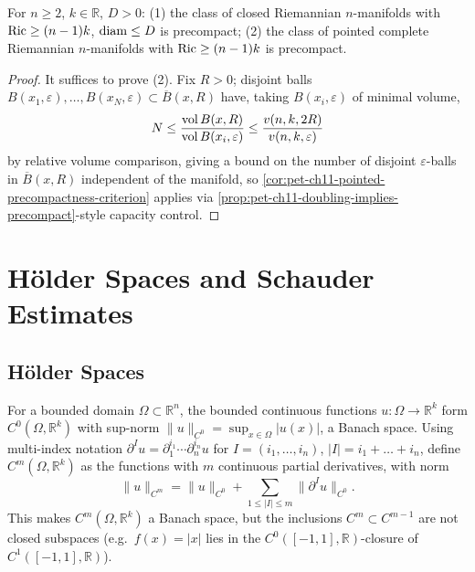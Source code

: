 \begin{corollary}
  \label{cor:pet-ch11-ricci-diam-precompactness}
  For $n\ge2$, $k\in\mathbb{R}$, $D>0$: (1) the class of closed Riemannian
  $n$-manifolds with $\operatorname{Ric}\ge(n-1)k$, $\operatorname{diam}\le D$ is precompact; (2) the
  class of pointed complete Riemannian $n$-manifolds with $\operatorname{Ric}\ge(n-1)k$ is
  precompact.
\end{corollary}
\begin{proof}
  It suffices to prove (2). Fix $R>0$; disjoint balls
  $B(x_1,\varepsilon),\dots,B(x_N,\varepsilon)\subset\overline{B}(x,R)$ have,
  taking $B(x_i,\varepsilon)$ of minimal volume,
  \[
    N\le\frac{\operatorname{vol} B(x,R)}{\operatorname{vol} B(x_i,\varepsilon)}\le\frac{v(n,k,2R)}{v(n,k,\varepsilon)}
  \]
  by relative volume comparison, giving a bound on the number of disjoint
  $\varepsilon$-balls in $\overline{B}(x,R)$ independent of the manifold, so
  \cref{cor:pet-ch11-pointed-precompactness-criterion} applies via
  \cref{prop:pet-ch11-doubling-implies-precompact}-style capacity control.
\end{proof}

\section{Hölder Spaces and Schauder Estimates}

\subsection{Hölder Spaces}

\begin{definition}
  \label{def:pet-ch11-cm-norm}
  For a bounded domain $\Omega\subset\mathbb{R}^n$, the bounded continuous
  functions $u:\Omega\to\mathbb{R}^k$ form $C^0(\Omega,\mathbb{R}^k)$ with sup-norm
  $\|u\|_{C^0}=\sup_{x\in\Omega}|u(x)|$, a Banach space. Using multi-index
  notation $\partial^Iu=\partial_1^{i_1}\cdots\partial_n^{i_n}u$ for
  $I=(i_1,\dots,i_n)$, $|I|=i_1+\dots+i_n$, define $C^m(\Omega,\mathbb{R}^k)$ as
  the functions with $m$ continuous partial derivatives, with norm
  \[
    \|u\|_{C^m}=\|u\|_{C^0}+\sum_{1\le|I|\le m}\|\partial^Iu\|_{C^0}.
  \]
  This makes $C^m(\Omega,\mathbb{R}^k)$ a Banach space, but the inclusions
  $C^m\subset C^{m-1}$ are not closed subspaces (e.g.\ $f(x)=|x|$ lies in the
  $C^0([-1,1],\mathbb{R})$-closure of $C^1([-1,1],\mathbb{R})$).
\end{definition}

